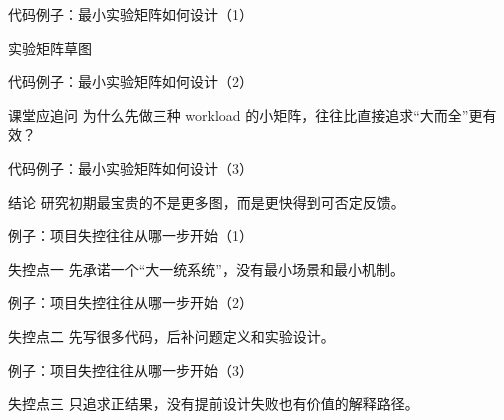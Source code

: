 \begin{frame}{代码例子：最小实验矩阵如何设计（1）}
\begin{block}{实验矩阵草图}
    {\ttfamily\small
    \par
    \par
    \par
    }
  \end{block}
\end{frame}

\begin{frame}{代码例子：最小实验矩阵如何设计（2）}
\begin{block}{课堂应追问}
    为什么先做三种 workload 的小矩阵，往往比直接追求“大而全”更有效？
  \end{block}
\end{frame}

\begin{frame}{代码例子：最小实验矩阵如何设计（3）}
\begin{block}{结论}
    研究初期最宝贵的不是更多图，而是更快得到可否定反馈。
  \end{block}
\end{frame}

\begin{frame}{例子：项目失控往往从哪一步开始（1）}
\begin{block}{失控点一}
    先承诺一个“大一统系统”，没有最小场景和最小机制。
  \end{block}
\end{frame}

\begin{frame}{例子：项目失控往往从哪一步开始（2）}
\begin{block}{失控点二}
    先写很多代码，后补问题定义和实验设计。
  \end{block}
\end{frame}

\begin{frame}{例子：项目失控往往从哪一步开始（3）}
\begin{block}{失控点三}
    只追求正结果，没有提前设计失败也有价值的解释路径。
  \end{block}
\end{frame}


